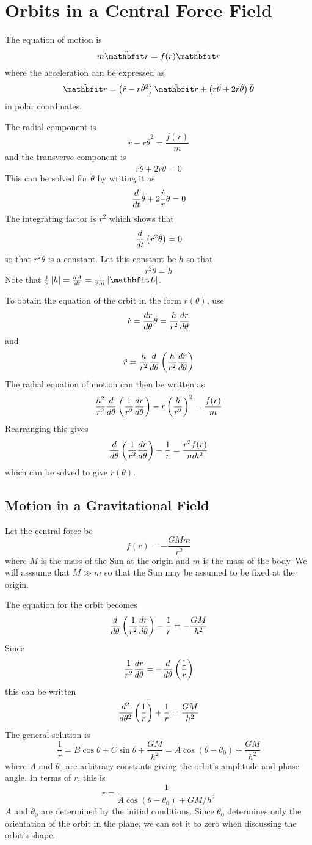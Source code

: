 \section{Orbits in a Central Force Field}

The equation of motion is
$$m\ddot{\vect{r}}=f(r)\rvect$$
where the acceleration can be expressed as
$$\ddot{\vect{r}}=\left(\ddot{r}-r\dot{\theta}^2\right)\rvect
+\left(r\ddot{\theta}+2\dot{r}\dot{\theta}\right)\tvect$$
in polar coordinates.

The radial component is
$$\ddot{r}-r\dot{\theta}^2=\frac{f(r)}{m}$$
and the transverse component is
$$r\ddot{\theta}+2\dot{r}\dot{\theta}=0$$
This can be solved for $\dot{\theta}$ by writing it as
$$\frac{d}{d{t}}\dot{\theta}+2\frac{\dot{r}}{r}\dot{\theta}=0$$
The integrating factor is $r^2$ which shows that
$$\frac{d}{d{t}}\left(r^2\dot{\theta}\right)=0$$
so that $r^2\dot{\theta}$ is a constant.  Let this constant be $h$ so that
$$r^2\dot{\theta}=h$$
Note that $\frac{1}{2}\left|h\right|=\der{A}{t}=\frac{1}{2m}\left|\vect{L}
\right|$.

To obtain the equation of the orbit in the form $r(\theta)$, use
$$\dot{r}=\frac{dr}{d\theta}\dot{\theta}=\frac{h}{r^2}\frac{dr}{d\theta}$$
and
$$\ddot{r}=\frac{h}{r^2}\frac{d}{d{\theta}}
\left(\frac{h}{r^2}\frac{dr}{d\theta}\right)$$
The radial equation of motion can then be written as
$$\frac{h^2}{r^2}\frac{d}{d{\theta}}\left(\frac{1}{r^2}\frac{dr}{d\theta}\right)
-r\left(\frac{h}{r^2}\right)^2=\frac{f(r)}{m}$$
Rearranging this gives
$$\frac{d}{d{\theta}}\left(\frac{1}{r^2}\frac{dr}{d\theta}\right)
-\frac{1}{r}=\frac{r^2f(r)}{mh^2}$$
which can be solved to give $r(\theta)$.

\subsection{Motion in a Gravitational Field}

Let the central force be
$$f(r)=-\frac{GMm}{r^2}$$
where $M$ is the mass of the Sun at the origin and $m$ is the mass of the
body.  We will asssume that $M\gg m$ so that the Sun may be assumed to be
fixed at the origin.

The equation for the orbit becomes
$$\frac{d}{d{\theta}}\left(\frac{1}{r^2}\frac{dr}{d\theta}\right)
-\frac{1}{r}=-\frac{GM}{h^2}$$
Since 
$$\frac{1}{r^2}\frac{dr}{d\theta}=-\frac{d}{d{\theta}}\left(\frac{1}{r}\right)$$
this can be written
$$\frac{d^{2}}{d{\theta}^{2}}\left(\frac{1}{r}\right)+\frac{1}{r}=\frac{GM}{h^2}$$
The general solution is
$$\frac{1}{r}=B\cos\theta+C\sin\theta+\frac{GM}{h^2}=A\cos(\theta-\theta_0)
+\frac{GM}{h^2}$$
where $A$ and $\theta_0$ are arbitrary constants giving the orbit's
amplitude and phase angle.  In terms of $r$, this is
$$r=\frac{1}{A\cos(\theta-\theta_0)+GM/h^2}$$
$A$ and $\theta_0$ are determined by the initial conditions.  Since
$\theta_0$ determines only the orientation of the orbit in the plane, we can
set it to zero when discussing the orbit's shape.

